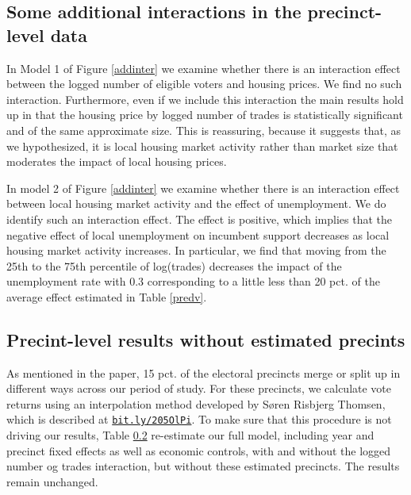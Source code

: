 \documentclass[12pt,a4paper]{article}
\begin{document}
			\newpage
			
			\subsection{Some additional interactions in the precinct-level data} \label{add_interaction}
				\setcounter{table}{0}
			\setcounter{figure}{0}
			
			In Model 1 of Figure \ref{addinter} we examine whether there is an interaction effect between the logged number of eligible voters and housing prices. We find no such interaction. Furthermore, even if we include this interaction the main results hold up in that the housing price by logged number of trades is statistically significant and of the same approximate size. This is reassuring, because it suggests that, as we hypothesized, it is local housing market activity rather than market size that moderates the impact of local housing prices.
			
			In model 2 of Figure \ref{addinter} we examine whether there is an interaction effect between local housing market activity and the effect of unemployment. We do identify such an interaction effect. The effect is positive, which implies that the negative effect of local unemployment on incumbent support decreases as local housing market activity increases. In particular, we find that moving from the 25th to the 75th percentile of log(trades) decreases the impact of the unemployment rate with 0.3 corresponding to a little less than 20 pct. of the average effect estimated in Table \ref{predv}.
			
						
			\newpage
			
			\subsection{Precint-level results without estimated precints} \label{calc}
				\setcounter{table}{0}
			\setcounter{figure}{0}
			
			As mentioned in the paper, 15 pct. of the electoral precincts merge or split up in different ways  across our period of study. For these precincts, we calculate vote returns using an interpolation method developed by Søren Risbjerg Thomsen, which is described at \texttt{\href{http://bit.ly/205OlPi}{bit.ly/205OlPi}}. To make sure that this procedure is not driving our results, Table \ref{calc} re-estimate our full model, including year and precinct fixed effects as well as economic controls, with and without the logged number og trades interaction, but without these estimated precincts. The results remain unchanged.  
			
			
			
			
		
\end{document}
